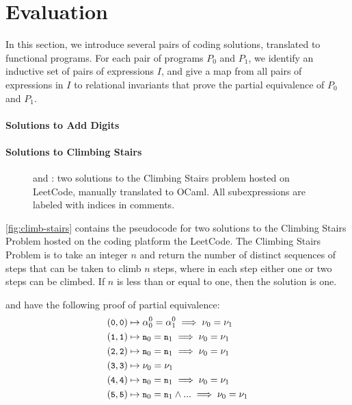 \section{Evaluation}
\label{sec:evaluation}
%
In this section, we introduce several pairs of coding solutions,
translated to functional programs.
%
For each pair of programs $P_0$ and $P_1$, we identify an inductive
set of pairs of expressions $I$, and give a map from all pairs of
expressions in $I$ to relational invariants that prove the partial
equivalence of $P_0$ and $P_1$.

\paragraph{Solutions to Add Digits}
%

\paragraph{Solutions to Climbing Stairs}
%
\begin{figure}[t]
  \begin{minipage}{0.48\linewidth}
    
  \end{minipage}
  \begin{minipage}{0.48\linewidth}
        
  \end{minipage}
  \caption{ and : two solutions to
    the Climbing Stairs problem hosted on LeetCode, manually translated
    to OCaml.
    All subexpressions are labeled with indices in comments.
  }
  \label{fig:climb-stairs}
\end{figure}
%
\autoref{fig:climb-stairs} contains the pseudocode for two solutions
to the Climbing Stairs Problem hosted on the coding platform the
LeetCode.
The Climbing Stairs Problem is to take an integer $n$ and return the
number of distinct sequences of steps that can be taken to climb $n$
steps, where in each step either one or two steps can be climbed. If
$n$ is less than or equal to one, then the solution is one.
%

%
 and  have the following proof of
partial equivalence:
%
\begin{align*}
  (\cc{0}, \cc{0}) & \mapsto %
  \alpha_0^0 = \alpha_1^0 \implies \nu_0 = \nu_1 \\
  (\cc{1}, \cc{1}) & \mapsto %
  \cc{n}_0 = \cc{n}_1 \implies \nu_0 = \nu_1 \\
  (\cc{2}, \cc{2}) & \mapsto %
  \cc{n}_0 = \cc{n}_1 \implies \nu_0 = \nu_1 \\
  (\cc{3}, \cc{3}) & \mapsto \nu_0 = \nu_1 \\
  (\cc{4}, \cc{4}) & \mapsto %
  \cc{n}_0 = \cc{n}_1 \implies \nu_0 = \nu_1 \\
  (\cc{5}, \cc{5}) & \mapsto %
  \cc{n}_0 = \cc{n}_1 \land ... \implies \nu_0 = \nu_1
\end{align*}
%


